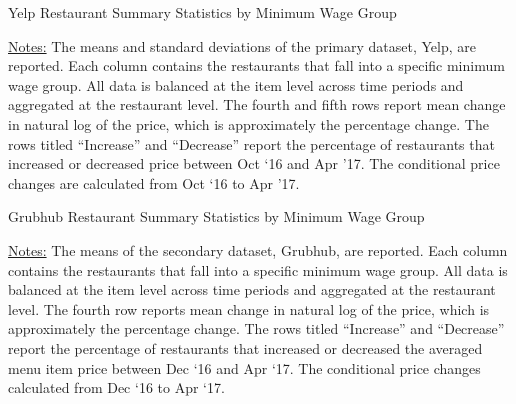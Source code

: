 \documentclass[11pt]{article}
\begin{document}
\vspace*{\fill}



\begin{table}[p]
\centering
\caption{Yelp Restaurant Summary Statistics by Minimum Wage Group}

{\footnotesize \raggedright \underline{Notes:} The means and standard deviations of the primary dataset, Yelp, are reported. Each column contains the restaurants that fall into a specific minimum wage group. All data is balanced at the item level across time periods and aggregated at the restaurant level. The fourth and fifth rows report mean change in natural log of the price, which is approximately the percentage change. The rows titled ``Increase'' and ``Decrease'' report the percentage of restaurants that increased or decreased price between Oct `16 and Apr '17. The conditional price changes are calculated from Oct `16 to Apr '17. \par }
\end{table}





\begin{table}[p]
\centering
\caption{Grubhub Restaurant Summary Statistics by Minimum Wage Group}

{\footnotesize \raggedright \underline{Notes:}  The means of the secondary dataset, Grubhub, are reported.  Each column contains the restaurants that fall into a specific minimum wage group. All data is balanced at the item level across time periods and aggregated at the restaurant level. The fourth row reports mean change in natural log of the price, which is approximately the percentage change. The rows titled ``Increase'' and ``Decrease'' report the percentage of restaurants that increased or decreased the averaged menu item price between Dec `16 and Apr `17. The conditional price changes calculated from Dec `16 to Apr `17. \par
}
\end{table}



\newpage
\end{document}

